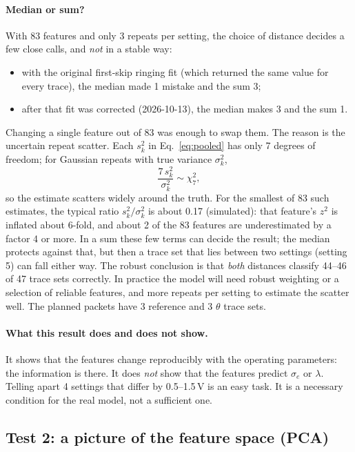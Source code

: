 \documentclass[10pt]{article}
\begin{document}
\paragraph{Median or sum?} With 83 features and only 3 repeats per setting, the choice of distance decides a few close
calls, and \emph{not} in a stable way:
\begin{itemize}
\item with the original first-skip ringing fit (which returned the same value for every trace), the median made 1 mistake and
  the sum 3;
\item after that fit was corrected (2026-10-13), the median makes 3 and the sum 1.
\end{itemize}
Changing a single feature out of 83 was enough to swap them. The reason is the uncertain repeat scatter. Each
$s_k^2$ in Eq.~\ref{eq:pooled} has only 7 degrees of freedom; for Gaussian repeats with true variance $\sigma_k^2$,
\begin{equation}
\frac{7\,s_k^2}{\sigma_k^2} \sim \chi^2_7 ,
\end{equation}
so the estimate scatters widely around the truth. For the smallest of 83 such estimates, the typical ratio
$s_k^2/\sigma_k^2$ is about 0.17 (simulated): that feature's $z^2$ is inflated about 6-fold, and about 2 of the 83 features
are underestimated by a factor 4 or more. In a sum these few terms can decide the result; the median protects against that,
but then a trace set that lies between two settings (setting 5) can fall either way. The robust conclusion is that
\emph{both} distances classify 44--46 of 47 trace sets correctly. In practice the model will need robust weighting or a
selection of reliable features, and more repeats per setting to estimate the scatter well. The planned packets have 3
reference and 3 $\theta$ trace sets.

\paragraph{What this result does and does not show.} It shows that the features change reproducibly with the operating
parameters: the information is there. It does \emph{not} show that the features predict $\sigma_e$ or $\lambda$. Telling
apart 4 settings that differ by 0.5--1.5\,V is an easy task. It is a necessary condition for the real model, not a
sufficient one.

\subsection{Test 2: a picture of the feature space (PCA)}
\label{sec:ml-pca}
\end{document}
